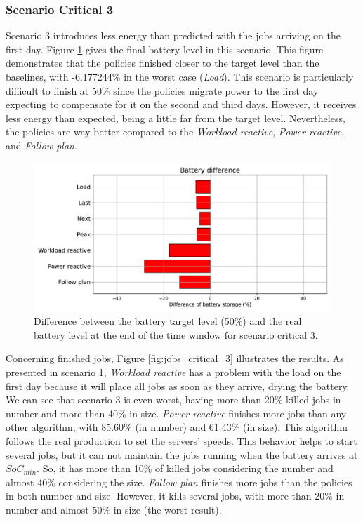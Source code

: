 \subsubsection{Scenario Critical 3}
Scenario 3 introduces less energy than predicted with the jobs arriving on the first day. Figure \ref{fig:SoC_critical_3} gives the final battery level in this scenario. This figure demonstrates that the policies finished closer to the target level than the baselines, with -6.177244\% in the worst case (\emph{Load}). This scenario is particularly difficult to finish at 50\% since the policies migrate power to the first day expecting to compensate for it on the second and third days. However, it receives less energy than expected, being a little far from the target level. Nevertheless, the policies are way better compared to the \emph{Workload reactive}, \emph{Power reactive}, and \emph{Follow plan}.

\begin{figure}[!htb]
    \centering
    \includegraphics[scale=0.55]{Images/Compensations/battery_critical_3.pdf}
    \caption{Difference between the battery target level (50\%) and the real battery level at the end of the time window for scenario critical 3.}
    \label{fig:SoC_critical_3}
\end{figure}

Concerning finished jobs, Figure \ref{fig:jobs_critical_3} illustrates the results. As presented in scenario 1, \emph{Workload reactive} has a problem with the load on the first day because it will place all jobs as soon as they arrive, drying the battery. We can see that scenario 3 is even worst, having more than 20\% killed jobs in number and more than 40\% in size. \emph{Power reactive} finishes more jobs than any other algorithm, with 85.60\% (in number) and 61.43\% (in size). This algorithm follows the real production to set the servers' speeds. This behavior helps to start several jobs, but it can not maintain the jobs running when the battery arrives at $SoC_{min}$. So, it has more than 10\% of killed jobs considering the number and almost 40\% considering the size. \emph{Follow plan} finishes more jobs than the policies in both number and size. However, it kills several jobs, with more than 20\% in number and almost 50\% in size (the worst result). 

